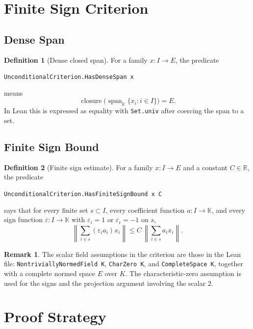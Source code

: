 \documentclass[12pt,a4paper]{article}
\theoremstyle{definition}
\newtheorem{definition}{Definition}[section]
\newtheorem{remark}{Remark}[section]
\newcommand{\Real}{\mathbb{R}}
\newcommand{\K}{\mathbb{K}}
\newcommand{\norm}[1]{\left\|#1\right\|}
\newcommand{\spanop}{\operatorname{span}}
\newcommand{\closure}{\operatorname{closure}}
\begin{document}
\newpage

\section{Finite Sign Criterion}

\subsection{Dense Span}

\begin{definition}[Dense closed span]
For a family $x : I \to E$, the predicate
\begin{center}
\verb|UnconditionalCriterion.HasDenseSpan x|
\end{center}
means
\[
  \closure\bigl(\spanop_{\K}\{x_i : i\in I\}\bigr)=E.
\]
In Lean this is expressed as equality with \verb|Set.univ| after coercing the
span to a set.
\end{definition}

\subsection{Finite Sign Bound}

\begin{definition}[Finite sign estimate]
For a family $x : I\to E$ and a constant $C\in\Real$, the predicate
\begin{center}
\verb|UnconditionalCriterion.HasFiniteSignBound x C|
\end{center}
says that for every finite set $s\subset I$, every coefficient function
$a : I\to\K$, and every sign function $\varepsilon : I\to\K$ with
$\varepsilon_i=1$ or $\varepsilon_i=-1$ on $s$,
\[
  \norm{\sum_{i\in s}(\varepsilon_i a_i)x_i}
  \le
  C\,\norm{\sum_{i\in s}a_i x_i}.
\]
\end{definition}

\begin{remark}
The scalar field assumptions in the criterion are those in the Lean file:
\verb|NontriviallyNormedField K|, \verb|CharZero K|, and
\verb|CompleteSpace K|, together with a complete normed space $E$ over $K$.
The characteristic-zero assumption is used for the signs and the projection
argument involving the scalar $2$.
\end{remark}

\newpage

\section{Proof Strategy}
\end{document}
